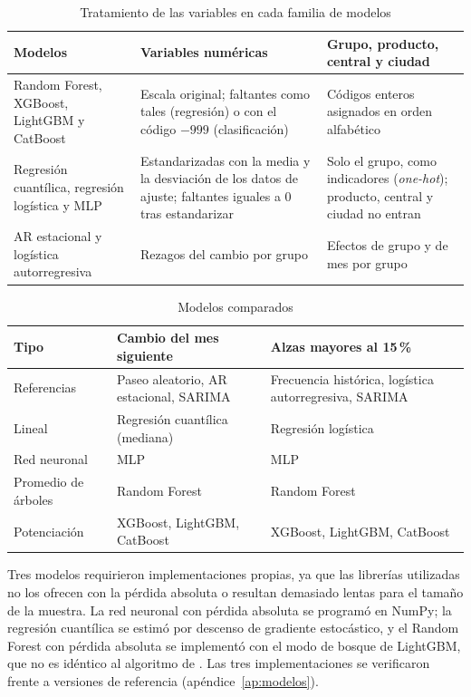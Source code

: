 \begin{table}[htbp]\centering\small
\caption{Tratamiento de las variables en cada familia de modelos}\label{tab:codificacion}
\begin{tabular}{>{\raggedright\arraybackslash}p{3.1cm}>{\raggedright\arraybackslash}p{4.4cm}>{\raggedright\arraybackslash}p{5.3cm}}\toprule
Modelos & Variables numéricas & Grupo, producto, central y ciudad\\ \midrule
Random Forest, XGBoost, LightGBM y CatBoost & Escala original; faltantes como tales (regresión) o con el código $-999$ (clasificación) & Códigos enteros asignados en orden alfabético\\
Regresión cuantílica, regresión logística y MLP & Estandarizadas con la media y la desviación de los datos de ajuste; faltantes iguales a 0 tras estandarizar & Solo el grupo, como indicadores (\emph{one-hot}); producto, central y ciudad no entran\\
AR estacional y logística autorregresiva & Rezagos del cambio por grupo & Efectos de grupo y de mes por grupo\\ \bottomrule
\end{tabular}
\end{table}

\begin{table}[htbp]\centering\small
\caption{Modelos comparados}\label{tab:modelos}
\begin{tabular}{l>{\raggedright\arraybackslash}p{4.7cm}>{\raggedright\arraybackslash}p{4.7cm}}\toprule
Tipo & Cambio del mes siguiente & Alzas mayores al 15\,\%\\ \midrule
Referencias & Paseo aleatorio, AR estacional, SARIMA & Frecuencia histórica, logística autorregresiva, SARIMA\\
Lineal & Regresión cuantílica (mediana) & Regresión logística\\
Red neuronal & MLP & MLP\\
Promedio de árboles & Random Forest & Random Forest\\
Potenciación & XGBoost, LightGBM, CatBoost & XGBoost, LightGBM, CatBoost\\ \bottomrule
\end{tabular}
\end{table}

Tres modelos requirieron implementaciones propias, ya que las librerías utilizadas no los ofrecen con la pérdida absoluta o resultan demasiado lentas para el tamaño de la muestra. La red neuronal con pérdida absoluta se programó en NumPy; la regresión cuantílica se estimó por descenso de gradiente estocástico, y el Random Forest con pérdida absoluta se implementó con el modo de bosque de LightGBM, que no es idéntico al algoritmo de \citet{breiman2001}. Las tres implementaciones se verificaron frente a versiones de referencia (apéndice~\ref{ap:modelos}).


